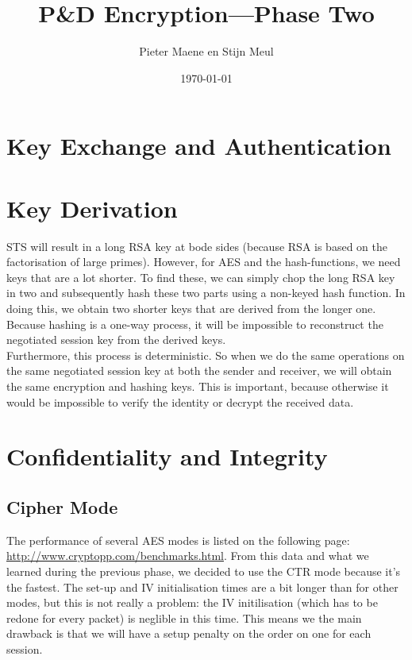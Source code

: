 \documentclass[a4paper]{article}
\title{P\&D Encryption---Phase Two}
\author{Pieter Maene en Stijn Meul}
\date{\today}
\begin{document}
\maketitle

\section{Key Exchange and Authentication}

\section{Key Derivation}

STS will result in a long RSA key at bode sides (because RSA is based on the factorisation of large primes). However, for AES and the hash-functions, we need keys that are a lot shorter. To find these, we can simply chop the long RSA key in two and subsequently hash these two parts using a non-keyed hash function. In doing this, we obtain two shorter keys that are derived from the longer one. Because hashing is a one-way process, it will be impossible to reconstruct the negotiated session key from the derived keys.\\

Furthermore, this process is deterministic. So when we do the same operations on the same negotiated session key at both the sender and receiver, we will obtain the same encryption and hashing keys. This is important, because otherwise it would be impossible to verify the identity or decrypt the received data.\\

\section{Confidentiality and Integrity}

\subsection{Cipher Mode}

The performance of several AES modes is listed on the following page: \url{http://www.cryptopp.com/benchmarks.html}. From this data and what we learned during the previous phase, we decided to use the CTR mode because it's the fastest. The set-up and IV initialisation times are a bit longer than for other modes, but this is not really a problem: the IV initilisation (which has to be redone for every packet) is neglible in this time. This means we the main drawback is that we will have a setup penalty on the order on one {\micro\second} for each session.\\
\end{document}
